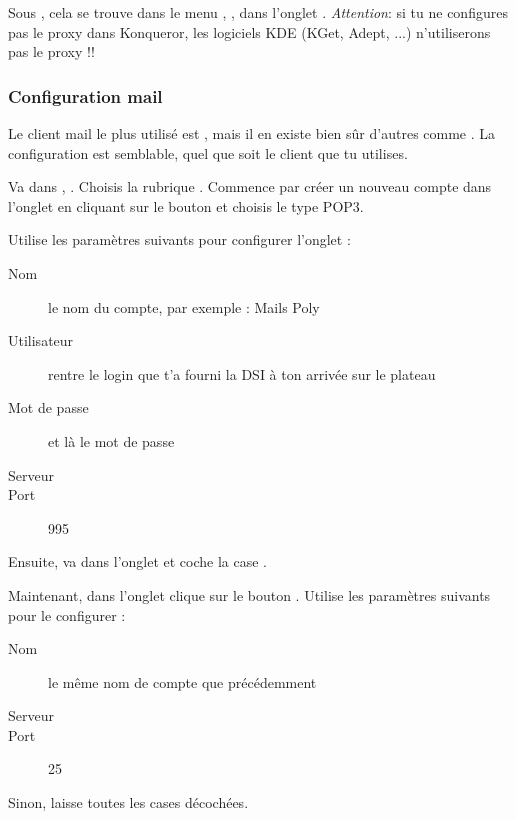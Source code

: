 Sous , cela se trouve dans le menu , ,
dans l'onglet . \emph{Attention}: si tu ne configures pas le proxy dans Konqueror,
les logiciels KDE (KGet, Adept, ...) n'utiliserons pas le proxy !!




\subsubsection{Configuration mail}

 Le client mail le plus
utilis\'e est , mais il en existe bien s\^ur d'autres comme
. La configuration est semblable, quel que soit le
client que tu utilises.

Va dans , . Choisis la
rubrique . Commence par cr\'eer un nouveau compte dans
l'onglet  en cliquant sur le bouton
 et choisis le type POP3.


Utilise les param\`etres suivants pour configurer l'onglet
 :
\begin{description}
  \item[Nom] le nom du compte, par exemple : Mails Poly
  \item[Utilisateur] rentre le login  que t'a fourni la DSI \`a ton arriv\'ee sur le plateau
  \item[Mot de passe] et l\`a le mot de passe 
  \item[Serveur] 
  \item[Port] 995
\end{description}

Ensuite, va dans l'onglet  et coche la case
.


Maintenant, dans l'onglet  clique sur le
bouton . Utilise les param\`etres suivants pour le
configurer :
\begin{description}
  \item[Nom] le m\^eme nom de compte que pr\'ec\'edemment
  \item[Serveur] 
  \item[Port] 25
\end{description}
Sinon, laisse toutes les cases d\'ecoch\'ees.

